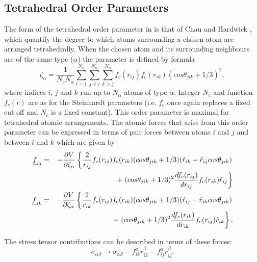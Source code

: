 \subsection{Tetrahedral Order Parameters}
The form of the tetrahedral order parameter in \D{} is that of Chau and
Hardwick \cite{chau-98a}, which quantify the degree to which atoms
surrounding a chosen atom are arranged tetrahedrally. When the chosen atom and
its surrounding neighbours are of the same type ($\alpha$) the parameter is
defined by formula
\begin{equation}
\zeta_{\alpha}=\frac{1}{N_{c}N_{\alpha}}\sum_{i=1}^{N_{\alpha}}
\sum_{j\ne i}^{N_{\alpha}}\sum_{k>j}^{N_{\alpha}} 
f_{c}(r_{ij})f_{c}(r_{ik})(cos \theta_{jik}+1/3)^{2}, \label{tetra1}
\end{equation}
where indices $i$, $j$ and $k$ run up to $N_{\alpha}$ atoms of type
$\alpha$. Integer $N_{c}$ and function $f_{c}(r)$ are as for the Steinhardt
parameters (i.e. $f_{c}$ once again replaces a fixed cut off and $N_{c}$ is a
fixed constant). This order parameter is maximal for tetrahedral atomic
arrangements. The atomic forces that arise from this order parameter can be
expressed in terms of pair forces between atoms $i$ and $j$ and between $i$
and $k$ which are given by
\begin{eqnarray}
\mbox{$\underline{f}$}_{ij}&=&-\frac{\partial V}{\partial \zeta_{\alpha}} \left \{
  \frac{2}{r_{ij}}f_{c}(r_{ij})f_{c}(r_{ik})(cos \theta_{jik}+1/3)
(\hat{r}_{ik}-\hat{r}_{ij}cos \theta_{jik}) \right . \nonumber \\
& & +\left .(cos \theta_{jik}+1/3)^{2}
\frac{df_{c}(r_{ij})}{dr_{ij}}f_{c}(r_{ik})\hat{r}_{ij} \right \} 
\label{tetra2}\\
\mbox{$\underline{f}$}_{ik}&=&-\frac{\partial V}{\partial \zeta_{\alpha}} \left \{
  \frac{2}{r_{ik}}f_{c}(r_{ij})f_{c}(r_{ik})(cos \theta_{jik}+1/3)
(\hat{r}_{ij}-\hat{r}_{ik}cos \theta_{jik}) \right . \nonumber \\
& & +\left . (cos \theta_{jik}+1/3)^{2}
\frac{df_{c}(r_{ik})}{dr_{ik}}f_{c}(r_{ij})\hat{r}_{ik} \right \}.
\label{tetra3}
\end{eqnarray}

The stress tensor contributions can be described in terms of these forces:
\begin{equation}
\sigma_{\alpha\beta} \rightarrow \sigma_{\alpha\beta}
-f_{ik}^{\alpha}r_{ik}^{\beta}-f_{ij}^{\alpha}r_{ij}^{\beta}.\label{tetra4}
\end{equation}


